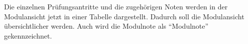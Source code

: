 \documentclass[a4paper,10pt]{scrartcl}
\begin{document}
Die einzelnen Prüfungsantritte und die zugehörigen Noten werden in der Modulansicht jetzt in einer Tabelle dargestellt. Dadurch soll die Modulansicht übersichtlicher werden. Auch wird
die Modulnote als ``Modulnote'' gekennzeichnet.

\noindent{}
\medskip
\end{document}
